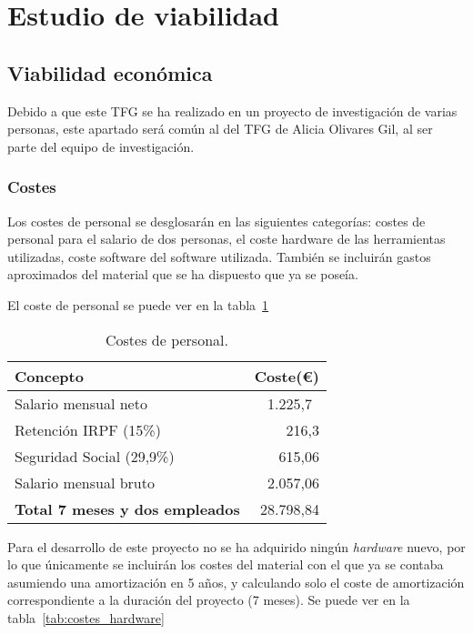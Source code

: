 \section{Estudio de viabilidad}

\subsection{Viabilidad económica}

Debido a que este TFG se ha realizado en un proyecto de investigación de varias personas, este apartado será común al del TFG de Alicia Olivares Gil, al ser parte del equipo de investigación.

\subsubsection{Costes}

Los costes de personal se desglosarán en las siguientes categorías: costes de personal para el salario de dos personas, el coste hardware de las herramientas utilizadas, coste software del software utilizada. También se incluirán gastos aproximados del material que se ha dispuesto que ya se poseía.

El coste de personal se puede ver en la tabla~\ref{tab:costes_personal}
 
\begin{table}\centering
	\begin{tabular}[]{@{}l r@{}}
		\toprule
		\textbf{Concepto} & \textbf{Coste(\euro{})} \\
		\midrule
		Salario mensual neto & 1.225,7~\cite{salariales} \\
		Retención IRPF (15\%) & 216,3 \\
		Seguridad Social (29,9\%) & 615,06 \\
		Salario mensual bruto & 2.057,06 \\\hubu
		\textbf{Total 7 meses y dos empleados} &  28.798,84 \\
		\bottomrule
	\end{tabular}
	\caption{Costes de personal.}
	\label{tab:costes_personal}
\end{table}

Para el desarrollo de este proyecto no se ha adquirido ningún \textit{hardware} nuevo, por lo que únicamente se incluirán los costes del material con el que ya se contaba asumiendo una amortización en 5 años, y calculando solo el coste de amortización correspondiente a la duración del proyecto (7 meses). Se puede ver en la tabla~\ref{tab:costes_hardware}

